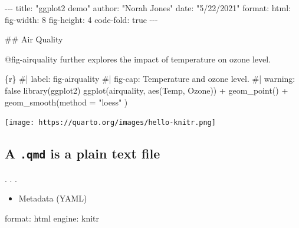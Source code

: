 \documentclass[
  letterpaper,
  DIV=11,
  numbers=noendperiod]{scrartcl}
\newenvironment{Shaded}{\begin{snugshade}}{\end{snugshade}}
\newcommand{\AnnotationTok}[1]{\textcolor[rgb]{0.37,0.37,0.37}{#1}}
\newcommand{\AttributeTok}[1]{\textcolor[rgb]{0.40,0.45,0.13}{#1}}
\newcommand{\CommentTok}[1]{\textcolor[rgb]{0.37,0.37,0.37}{#1}}
\newcommand{\FunctionTok}[1]{\textcolor[rgb]{0.28,0.35,0.67}{#1}}
\newcommand{\InformationTok}[1]{\textcolor[rgb]{0.37,0.37,0.37}{#1}}
\newcommand{\KeywordTok}[1]{\textcolor[rgb]{0.00,0.23,0.31}{#1}}
\newcommand{\NormalTok}[1]{\textcolor[rgb]{0.00,0.23,0.31}{#1}}
\newcommand{\SpecialCharTok}[1]{\textcolor[rgb]{0.37,0.37,0.37}{#1}}
\newcommand{\StringTok}[1]{\textcolor[rgb]{0.13,0.47,0.30}{#1}}
\providecommand{\tightlist}{%
  \setlength{\itemsep}{0pt}\setlength{\parskip}{0pt}}\usepackage{longtable,booktabs,array}
\begin{document}
\begin{Shaded}
\begin{Highlighting}[]
\CommentTok{{-}{-}{-}}
\AnnotationTok{title:}\CommentTok{ "ggplot2 demo"}
\AnnotationTok{author:}\CommentTok{ "Norah Jones"}
\AnnotationTok{date:}\CommentTok{ "5/22/2021"}
\AnnotationTok{format:}\CommentTok{ }
\CommentTok{  html:}
\CommentTok{    fig{-}width: 8}
\CommentTok{    fig{-}height: 4}
\CommentTok{    code{-}fold: true}
\CommentTok{{-}{-}{-}}

\FunctionTok{\#\# Air Quality}

\NormalTok{@fig{-}airquality further explores the impact of temperature }
\NormalTok{  on ozone level.}

\InformationTok{\textasciigrave{}\textasciigrave{}\textasciigrave{}\{r\}}
\CommentTok{\#| label: fig{-}airquality}
\CommentTok{\#| fig{-}cap: Temperature and ozone level.}
\CommentTok{\#| warning: false}
\FunctionTok{library}\NormalTok{(ggplot2)}
\FunctionTok{ggplot}\NormalTok{(airquality, }\FunctionTok{aes}\NormalTok{(Temp, Ozone)) }\SpecialCharTok{+} 
  \FunctionTok{geom\_point}\NormalTok{() }\SpecialCharTok{+} 
  \FunctionTok{geom\_smooth}\NormalTok{(}\AttributeTok{method =} \StringTok{"loess"}
\NormalTok{)}
\InformationTok{\textasciigrave{}\textasciigrave{}\textasciigrave{}}
\end{Highlighting}
\end{Shaded}

\texttt{[image: https://quarto.org/images/hello-knitr.png]}

\hypertarget{a-.qmd-is-a-plain-text-file}{%
\subsection{\texorpdfstring{A \texttt{.qmd} is a plain text
file}{A .qmd is a plain text file}}\label{a-.qmd-is-a-plain-text-file}}

. . .

\begin{itemize}
\tightlist
\item
  Metadata (YAML)
\end{itemize}

\begin{Shaded}
\begin{Highlighting}[]
\FunctionTok{format}\KeywordTok{:}\AttributeTok{ html}
\FunctionTok{engine}\KeywordTok{:}\AttributeTok{ knitr}
\end{Highlighting}
\end{Shaded}
\end{document}
